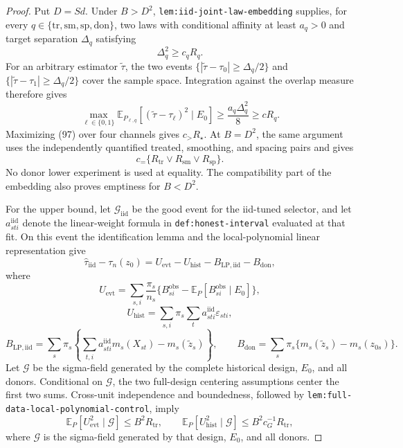 \documentclass{article}
\begin{document}
\begin{proof}
Put \(D=Sd\).  Under \(B>D^2\), \texttt{lem:iid-joint-law-embedding} supplies, for every
\(q\in\{\mathrm{tr},\mathrm{sm},\mathrm{sp},\mathrm{don}\}\), two laws with conditional affinity at least \(a_q>0\) and target separation \(\Delta_q\) satisfying
\[
\Delta_q^2\geq c_qR_q.
\tag{96}
\]
For an arbitrary estimator \(\widetilde\tau\), the two events
\(\{|\widetilde\tau-\tau_0|\geq\Delta_q/2\}\) and
\(\{|\widetilde\tau-\tau_1|\geq\Delta_q/2\}\) cover the sample space.  Integration against the overlap measure therefore gives
\[
\max_{\ell\in\{0,1\}}
\mathbb E_{P_{\ell,q}}[(\widetilde\tau-\tau_\ell)^2\mid E_0]
\geq\frac{a_q\Delta_q^2}{8}
\geq cR_q.
\tag{97}
\]
Maximizing (97) over four channels gives \(c_{>}R_\star\).  At \(B=D^2\), the same argument uses the independently quantified treated, smoothing, and spacing pairs and gives
\[
c_{=}\{R_{\mathrm{tr}}\vee R_{\mathrm{sm}}\vee R_{\mathrm{sp}}\}.
\tag{98}
\]
No donor lower experiment is used at equality.  The compatibility part of the embedding also proves emptiness for \(B<D^2\).

For the upper bound, let \(\mathcal G_{\mathrm{iid}}\) be the good event for the iid-tuned selector, and let \(a_{sti}^{\mathrm{iid}}\) denote the linear-weight formula in \texttt{def:honest-interval} evaluated at that fit.  On this event the identification lemma and the local-polynomial linear representation give
\[
\widehat\tau_{\mathrm{iid}}-\tau_n(z_0)
=U_{\mathrm{evt}}-U_{\mathrm{hist}}
-B_{\mathrm{LP,iid}}-B_{\mathrm{don}},
\tag{99}
\]
where
\[
U_{\mathrm{evt}}
=\sum_{s,i}\frac{\pi_s}{n_s}
\{B_{si}^{\mathrm{obs}}-\mathbb E_P[B_{si}^{\mathrm{obs}}\mid E_0]\},
\]
\[
U_{\mathrm{hist}}
=\sum_{s,i}\pi_s\sum_ta_{sti}^{\mathrm{iid}}\varepsilon_{sti},
\]
\[
B_{\mathrm{LP,iid}}
=\sum_s\pi_s\left\{\sum_{t,i}a_{sti}^{\mathrm{iid}}m_s(X_{st})
-m_s(\widetilde z_s)\right\},
\qquad
B_{\mathrm{don}}
=\sum_s\pi_s\{m_s(\widetilde z_s)-m_s(z_{0s})\}.
\]
Let \(\mathscr G\) be the sigma-field generated by the complete historical design, \(E_0\), and all donors.  Conditional on \(\mathscr G\), the two full-design centering assumptions center the first two sums.  Cross-unit independence and boundedness, followed by \texttt{lem:full-data-local-polynomial-control}, imply
\[
\mathbb E_P[U_{\mathrm{evt}}^2\mid\mathscr G]
\leq B^2R_{\mathrm{tr}},
\qquad
\mathbb E_P[U_{\mathrm{hist}}^2\mid\mathscr G]
\leq B^2c_G^{-1}R_{\mathrm{tr}},
\tag{100}
\]
where \(\mathscr G\) is the sigma-field generated by that design, \(E_0\), and all donors.


\end{proof}
\end{document}
